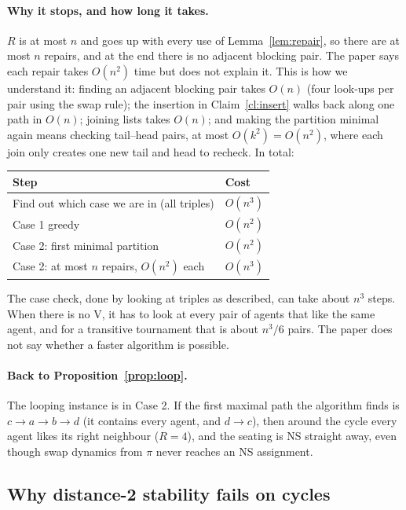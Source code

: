 \documentclass[11pt,a4paper]{article}
\theoremstyle{definition}
\theoremstyle{remark}
\theoremstyle{plain}
\begin{document}
\paragraph{Why it stops, and how long it takes.} $R$ is at most $n$ and goes up with every use of Lemma~\ref{lem:repair}, so there are at most $n$ repairs, and at the end there is no adjacent blocking pair. The paper says each repair takes $O(n^2)$ time but does not explain it. This is how we understand it: finding an adjacent blocking pair takes $O(n)$ (four look-ups per pair using the swap rule); the insertion in Claim~\ref{cl:insert} walks back along one path in $O(n)$; joining lists takes $O(n)$; and making the partition minimal again means checking tail--head pairs, at most $O(k^2)=O(n^2)$, where each join only creates one new tail and head to recheck. In total:
\begin{center}
\begin{tabular}{@{}ll@{}}
\toprule
Step & Cost \\
\midrule
Find out which case we are in (all triples) & $O(n^3)$ \\
Case 1 greedy & $O(n^2)$ \\
Case 2: first minimal partition & $O(n^2)$ \\
Case 2: at most $n$ repairs, $O(n^2)$ each & $O(n^3)$ \\
\bottomrule
\end{tabular}
\end{center}
The case check, done by looking at triples as described, can take about $n^3$ steps. When there is no V, it has to look at every pair of agents that like the same agent, and for a transitive tournament that is about $n^3/6$ pairs. The paper does not say whether a faster algorithm is possible.

\paragraph{Back to Proposition~\ref{prop:loop}.} The looping instance is in Case 2. If the first maximal path the algorithm finds is $c\to a\to b\to d$ (it contains every agent, and $d\to c$), then around the cycle every agent likes its right neighbour ($R=4$), and the seating is NS straight away, even though swap dynamics from $\pi$ never reaches an NS assignment.


\subsection{Why distance-2 stability fails on cycles}\label{sec:c5}
\end{document}
